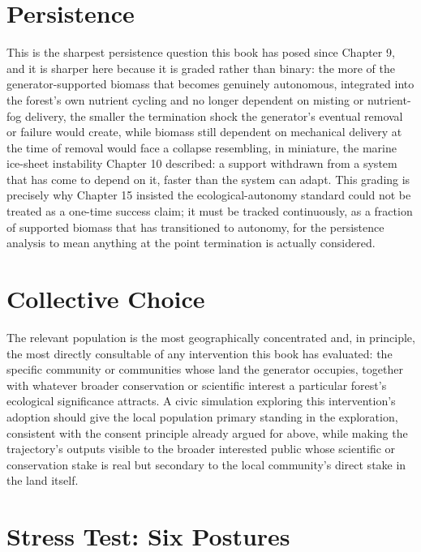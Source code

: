 \documentclass[11pt,oneside]{book}
\begin{document}
\section*{Persistence}

This is the sharpest persistence question this book has posed since Chapter 9, and it is sharper here because it is graded rather than binary: the more of the generator-supported biomass that becomes genuinely autonomous, integrated into the forest's own nutrient cycling and no longer dependent on misting or nutrient-fog delivery, the smaller the termination shock the generator's eventual removal or failure would create, while biomass still dependent on mechanical delivery at the time of removal would face a collapse resembling, in miniature, the marine ice-sheet instability Chapter 10 described: a support withdrawn from a system that has come to depend on it, faster than the system can adapt. This grading is precisely why Chapter 15 insisted the ecological-autonomy standard could not be treated as a one-time success claim; it must be tracked continuously, as a fraction of supported biomass that has transitioned to autonomy, for the persistence analysis to mean anything at the point termination is actually considered.

\section*{Collective Choice}

The relevant population is the most geographically concentrated and, in principle, the most directly consultable of any intervention this book has evaluated: the specific community or communities whose land the generator occupies, together with whatever broader conservation or scientific interest a particular forest's ecological significance attracts. A civic simulation exploring this intervention's adoption should give the local population primary standing in the exploration, consistent with the consent principle already argued for above, while making the trajectory's outputs visible to the broader interested public whose scientific or conservation stake is real but secondary to the local community's direct stake in the land itself.

\section*{Stress Test: Six Postures}
\end{document}
